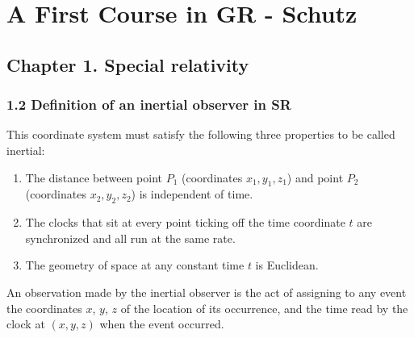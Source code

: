 \documentclass[11pt,letterpaper]{book}
\begin{document}
\chapter{A First Course in GR - Schutz}

\section{Chapter 1. Special relativity}
    \subsection{1.2 Definition of an inertial observer in SR}
        This coordinate system must satisfy the following three properties to be called inertial:

        \begin{enumerate}
            \item The distance between point \( P_1 \) (coordinates \( x_1, y_1, z_1 \)) and point \( P_2 \) (coordinates \( x_2, y_2, z_2 \)) is independent of time.
            \item The clocks that sit at every point ticking off the time coordinate \( t \) are synchronized and all run at the same rate.
            \item The geometry of space at any constant time \( t \) is Euclidean.
        \end{enumerate}
        An observation made by the inertial observer is the act of assigning to any event the coordinates \( x \), \( y \), \( z \) of the location of its occurrence, and the time read by the clock at \( (x, y, z) \) when the event occurred.
\end{document}
